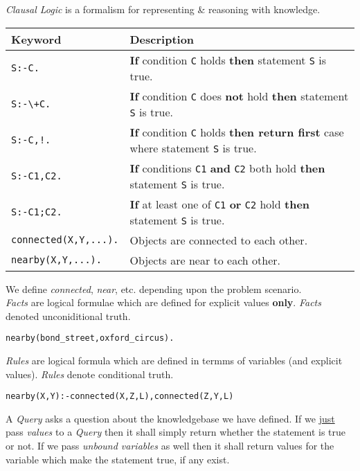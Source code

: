 \documentclass[11pt,a4paper]{article}
\begin{document}
\textit{Clausal Logic} is a formalism for representing \& reasoning with knowledge.
\begin{center}
\begin{tabular}{l|l}
\textbf{Keyword}&\textbf{Description}\\
\hline
{\lstinline!S:-C.!}&\textbf{If} condition {\lstinline!C!} holds \textbf{then} statement {\lstinline!S!} is true.\\
{\lstinline!S:-\+C.!}&\textbf{If} condition {\lstinline!C!} does \textbf{not} hold \textbf{then} statement {\lstinline!S!} is true.\\
{\lstinline|S:-C,!.|}&\textbf{If} condition {\lstinline!C!} holds \textbf{then return first} case where statement {\lstinline!S!} is true.\\
{\lstinline!S:-C1,C2.!}&\textbf{If} conditions {\lstinline!C1!} \textbf{and} {\lstinline!C2!} both hold \textbf{then} statement {\lstinline!S!} is true.\\
{\lstinline!S:-C1;C2.!}&\textbf{If} at least one of {\lstinline!C1!} \textbf{or} {\lstinline!C2!} hold \textbf{then} statement {\lstinline!S!} is true.\\
{\lstinline!connected(X,Y,...).!}&Objects are connected to each other.\\
{\lstinline!nearby(X,Y,...).!}&Objects are near to each other.\\
\end{tabular}
\end{center}
\nb We define \textit{connected}, \textit{near}, etc. depending upon the problem scenario.\\

\textit{Facts} are logical formulae which are defined for explicit values \textbf{only}. \textit{Facts} denoted unconiditional truth.
\begin{center}{\lstinline!nearby(bond_street,oxford_circus).!}\end{center}
\textit{Rules} are logical formula which are defined in termms of variables (and explicit values). \textit{Rules} denote conditional truth.
\begin{center}{\lstinline!nearby(X,Y):-connected(X,Z,L),connected(Z,Y,L)!}\end{center}

A \textit{Query} asks a question about the knowledgebase we have defined. If we \underline{just} pass \textit{values} to a \textit{Query} then it shall simply return whether the statement is true or not. If we pass \textit{unbound variables} as well then it shall return values for the variable which make the statement true, if any exist.\\
\end{document}
